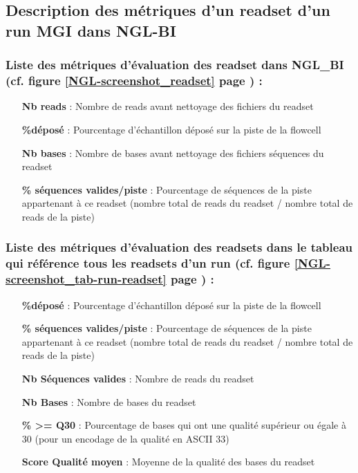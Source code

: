 

\subsection*{Description des métriques d'un readset d'un run MGI dans NGL-BI}
\label{anexes3}
\subsubsection*{Liste des métriques d'évaluation des readset dans NGL\_BI (cf. figure \ref{NGL-screenshot_readset} page \pageref{NGL-screenshot_readset}) : }
\begin{itemize}
    \item[\textbf{Nb reads} :] Nombre de reads avant nettoyage des fichiers du readset
    \item[\textbf{\%déposé} :] Pourcentage d'échantillon déposé sur la piste de la flowcell
    \item[\textbf{Nb bases} :] Nombre de bases avant nettoyage des fichiers séquences du readset
    \item[\textbf{\% séquences valides/piste} :] Pourcentage de séquences de la piste appartenant à ce readset (nombre total de reads du readset / nombre total de reads de la piste)
\end{itemize}

\subsubsection*{Liste des métriques d'évaluation des readsets dans le tableau qui référence tous les readsets d'un run (cf. figure \ref{NGL-screenshot_tab-run-readset} page \pageref{NGL-screenshot_tab-run-readset}) :}
\begin{itemize}
    \item[\textbf{\%déposé} :] Pourcentage d'échantillon déposé sur la piste de la flowcell
    \item[\textbf{\% séquences valides/piste} :] Pourcentage de séquences de la piste appartenant à ce readset (nombre total de reads du readset / nombre total de reads de la piste)
    \item[\textbf{Nb Séquences valides} :] Nombre de reads du readset
    \item[\textbf{Nb Bases} :] Nombre de bases du readset
    \item[\textbf{\% >= Q30} :] Pourcentage de bases qui ont une qualité supérieur ou égale à 30 (pour un encodage de la qualité en ASCII 33)
    \item[\textbf{Score Qualité moyen} :] Moyenne de la qualité des bases du readset
\end{itemize}


